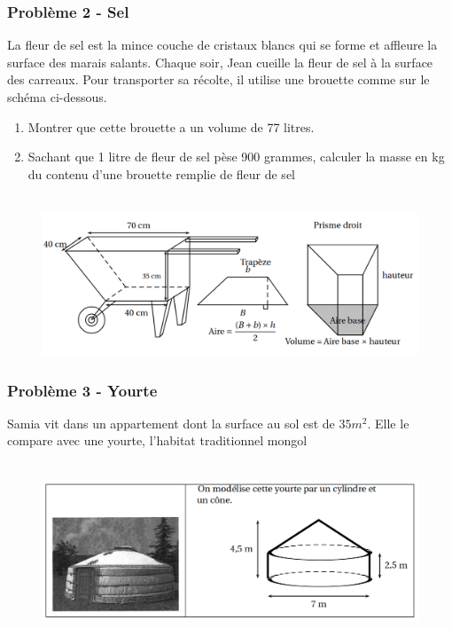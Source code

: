 \documentclass[11pt]{article}
\begin{document}
\begin{multicols}{2}

\subsubsection*{Problème 2 - Sel}

La fleur de sel est la mince couche de cristaux blancs qui se forme et affleure la surface des marais salants. Chaque soir, Jean cueille la fleur de sel à la surface des carreaux. Pour transporter sa récolte, il utilise une brouette comme sur le schéma ci-dessous.

\begin{enumerate}
\item Montrer que cette brouette a un volume de 77 litres.
\item Sachant que 1 litre de fleur de sel pèse 900 grammes, calculer la masse en kg du contenu d’une brouette remplie de fleur de sel
\end{enumerate}

\begin{figure}[H]
      \centering
      \includegraphics[width=\linewidth]{3x3-volumes-1/sources/brouette.png}
\end{figure}

\end{multicols}

\subsubsection*{Problème 3 - Yourte}

Samia vit dans un appartement dont la surface au sol est de $35 m^2$. Elle le compare avec une yourte, l’habitat traditionnel mongol

\begin{figure}[H]
      \centering
      \includegraphics[width=0.6\linewidth]{3x3-volumes-1/sources/yourte.png}
\end{figure}
\end{document}
